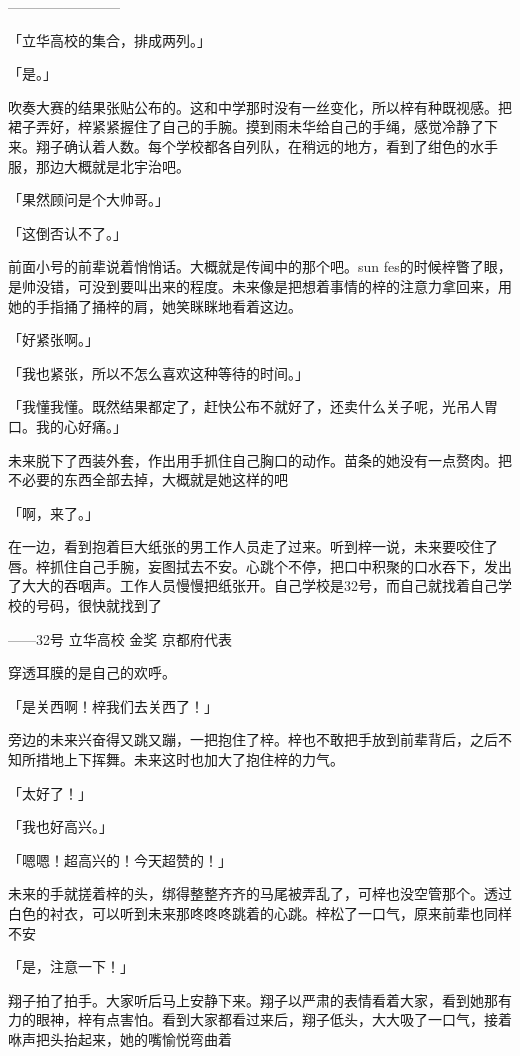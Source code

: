 \documentclass[UTF8]{ctexart}
\begin{document}
    ————————

    「立华高校的集合，排成两列。」

    「是。」

    吹奏大赛的结果张贴公布的。这和中学那时没有一丝变化，所以梓有种既视感。把裙子弄好，梓紧紧握住了自己的手腕。摸到雨未华给自己的手绳，感觉冷静了下来。翔子确认着人数。每个学校都各自列队，在稍远的地方，看到了绀色的水手服，那边大概就是北宇治吧。

    「果然顾问是个大帅哥。」

    「这倒否认不了。」

    前面小号的前辈说着悄悄话。大概就是传闻中的那个吧。sun fes的时候梓瞥了眼，是帅没错，可没到要叫出来的程度。未来像是把想着事情的梓的注意力拿回来，用她的手指捅了捅梓的肩，她笑眯眯地看着这边。

    「好紧张啊。」

    「我也紧张，所以不怎么喜欢这种等待的时间。」

    「我懂我懂。既然结果都定了，赶快公布不就好了，还卖什么关子呢，光吊人胃口。我的心好痛。」

    未来脱下了西装外套，作出用手抓住自己胸口的动作。苗条的她没有一点赘肉。把不必要的东西全部去掉，大概就是她这样的吧

    「啊，来了。」

    在一边，看到抱着巨大纸张的男工作人员走了过来。听到梓一说，未来要咬住了唇。梓抓住自己手腕，妄图拭去不安。心跳个不停，把口中积聚的口水吞下，发出了大大的吞咽声。工作人员慢慢把纸张开。自己学校是32号，而自己就找着自己学校的号码，很快就找到了

    ——32号 立华高校 金奖 京都府代表

    穿透耳膜的是自己的欢呼。

    「是关西啊！梓我们去关西了！」

    旁边的未来兴奋得又跳又蹦，一把抱住了梓。梓也不敢把手放到前辈背后，之后不知所措地上下挥舞。未来这时也加大了抱住梓的力气。

    「太好了！」

    「我也好高兴。」

    「嗯嗯！超高兴的！今天超赞的！」

    未来的手就搓着梓的头，绑得整整齐齐的马尾被弄乱了，可梓也没空管那个。透过白色的衬衣，可以听到未来那咚咚咚跳着的心跳。梓松了一口气，原来前辈也同样不安

    「是，注意一下！」

    翔子拍了拍手。大家听后马上安静下来。翔子以严肃的表情看着大家，看到她那有力的眼神，梓有点害怕。看到大家都看过来后，翔子低头，大大吸了一口气，接着咻声把头抬起来，她的嘴愉悦弯曲着
\end{document}
